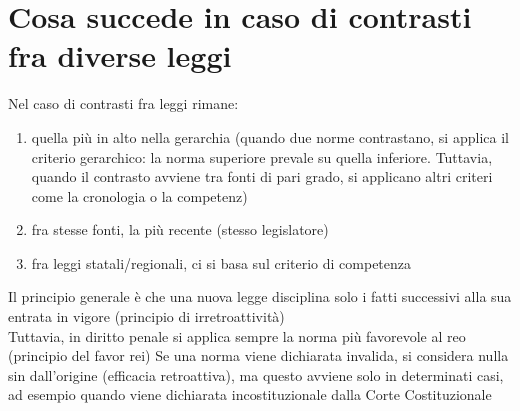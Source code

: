 \documentclass[8pt,oneside,a4paper]{article}
\begin{document}
	\section{Cosa succede in caso di contrasti fra diverse leggi}
	Nel caso di contrasti fra leggi rimane:
	\begin{enumerate}
		\item quella più in alto nella gerarchia (quando due norme contrastano, si applica il criterio gerarchico: la norma superiore prevale su quella inferiore. Tuttavia, quando il contrasto avviene tra fonti di pari grado, si applicano altri criteri come la cronologia o la competenz)
		\item fra stesse fonti, la più recente (stesso legislatore)
		\item fra leggi statali/regionali, ci si basa sul criterio di competenza
	\end{enumerate}
	Il principio generale è che una nuova legge disciplina solo i fatti successivi alla sua entrata in vigore (principio di irretroattività)\\
	Tuttavia, in diritto penale si applica sempre la norma più favorevole al reo (principio del favor rei)
	Se una norma viene dichiarata invalida, si considera nulla sin dall'origine (efficacia retroattiva), ma questo avviene solo in determinati casi, ad esempio quando viene dichiarata incostituzionale dalla Corte Costituzionale
\end{document}
